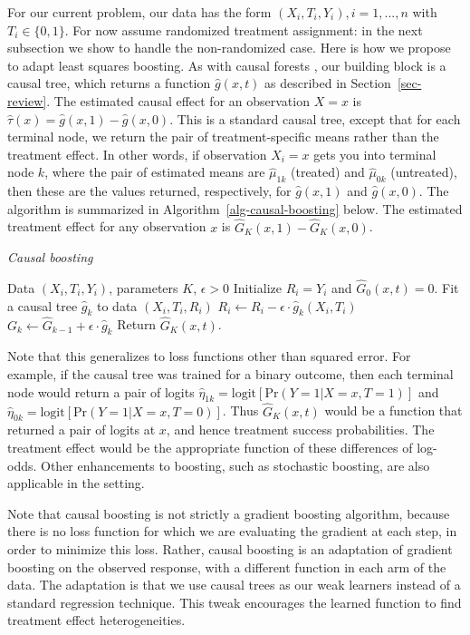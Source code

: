 \documentclass{article}
\begin{document}
For our current problem, our data has the form
$(X_i, T_i, Y_i), i = 1, ..., n$ with  $T_i \in \{0, 1\}$. For now
assume randomized treatment assignment:
in the next subsection we show to handle the non-randomized case.
Here is how we propose to adapt least squares boosting.
As with causal forests \citep{WagerAthey15}, our building block is a causal
tree, which returns a function
$\hat g(x, t)$ as described in Section~\ref{sec-review}.
The estimated causal effect for an observation $X = x$ is
$\hat \tau(x) = \hat g(x, 1) - \hat g(x, 0)$. This is a standard causal
tree, except that for each terminal node, we return the pair of
treatment-specific  means rather than the treatment effect. In other
words, if observation $X_i = x$ gets you into terminal node $k$, where the
pair of estimated means are $\hat\mu_{1k}$ (treated) and
$\hat\mu_{0k}$ (untreated), then these are the values returned,
respectively, for $\hat g(x, 1)$ and $\hat g(x, 0)$.
The algorithm is summarized in Algorithm~\ref{alg-causal-boosting} below.
The estimated treatment effect for any observation $x$ is
$\hat G_K(x, 1) - \hat G_K(x, 0)$.

\begin{algorithm}
\caption{\it Causal boosting}\label{alg-causal-boosting}
\begin{algorithmic}
  \REQUIRE Data $(X_i, T_i, Y_i)$, parameters $K$, $\epsilon > 0$
  \STATE Initialize $R_i = Y_i$ and $\hat G_0(x, t) = 0$.
    \STATE Fit a causal tree $\hat g_k$ to data $(X_i, T_i, R_i)$
    \STATE $R_i \leftarrow R_i - \epsilon \cdot \hat g_k(X_i, T_i)$
    \STATE $G_k \leftarrow \hat G_{k-1} + \epsilon \cdot \hat g_k$
  \ENDFOR
  \STATE Return $\hat G_K(x, t)$.
\end{algorithmic}
\end{algorithm}

Note that this generalizes to loss functions other than squared error. For
example, if the causal tree was trained for a binary outcome, then
each terminal node would return a pair of logits
$\hat\eta_{1k} = \mbox{logit}[\mbox{Pr}(Y = 1 | X = x, T = 1)]$ and
$\hat\eta_{0k} = \mbox{logit}[\mbox{Pr}(Y = 1 | X = x, T = 0)]$.
Thus $\hat G_K(x, t)$ would be a function that returned a pair of
logits at $x$, and hence treatment success probabilities. The
treatment effect would be the appropriate function of these
differences of log-odds. Other enhancements to boosting, such as stochastic
boosting, are also applicable in the setting.

Note that causal boosting is not strictly a gradient boosting algorithm,
because there is no loss function for which we are evaluating the gradient at
each step, in order to minimize this loss. Rather, causal boosting is an
adaptation of gradient boosting on the observed response, with a different
function in each arm of the data. The adaptation is that we use causal trees as
our weak learners instead of a standard regression technique. This tweak
encourages the learned function to find treatment effect heterogeneities.
\end{document}
